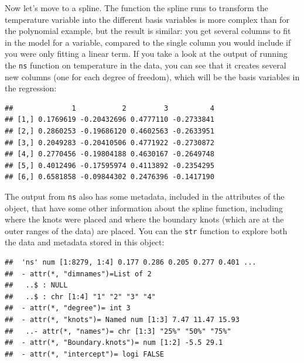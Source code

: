 \documentclass[
]{book}
\newenvironment{Shaded}{\begin{snugshade}}{\end{snugshade}}
\newcommand{\DataTypeTok}[1]{\textcolor[rgb]{0.13,0.29,0.53}{#1}}
\newcommand{\DecValTok}[1]{\textcolor[rgb]{0.00,0.00,0.81}{#1}}
\newcommand{\KeywordTok}[1]{\textcolor[rgb]{0.13,0.29,0.53}{\textbf{#1}}}
\newcommand{\NormalTok}[1]{#1}
\newcommand{\OperatorTok}[1]{\textcolor[rgb]{0.81,0.36,0.00}{\textbf{#1}}}
\newcommand{\StringTok}[1]{\textcolor[rgb]{0.31,0.60,0.02}{#1}}
\begin{document}
Now let's move to a spline. The function the spline runs to transform the temperature
variable into the different basis variables is more complex than for the polynomial example,
but the result is similar: you get several columns to fit in the model for a variable, compared
to the single column you would include if you were only fitting a linear term. If you
take a look at the output of running the \texttt{ns} function on temperature in the data, you can
see that it creates several new columns (one for each degree of freedom), which will be the
basis variables in the regression:

\begin{Shaded}
\end{Shaded}

\begin{verbatim}
##              1           2         3          4
## [1,] 0.1769619 -0.20432696 0.4777110 -0.2733841
## [2,] 0.2860253 -0.19686120 0.4602563 -0.2633951
## [3,] 0.2049283 -0.20410506 0.4771922 -0.2730872
## [4,] 0.2770456 -0.19804188 0.4630167 -0.2649748
## [5,] 0.4012496 -0.17595974 0.4113892 -0.2354295
## [6,] 0.6581858 -0.09844302 0.2476396 -0.1417190
\end{verbatim}

The output from \texttt{ns} also has some metadata, included in the attributes of the object, that
have some other information about the spline function, including where the knots were
placed and where the boundary knots (which are at the outer ranges of the data) are placed.
You can the \texttt{str} function to explore both the data and metadata stored in this object:

\begin{Shaded}
\end{Shaded}

\begin{verbatim}
##  'ns' num [1:8279, 1:4] 0.177 0.286 0.205 0.277 0.401 ...
##  - attr(*, "dimnames")=List of 2
##   ..$ : NULL
##   ..$ : chr [1:4] "1" "2" "3" "4"
##  - attr(*, "degree")= int 3
##  - attr(*, "knots")= Named num [1:3] 7.47 11.47 15.93
##   ..- attr(*, "names")= chr [1:3] "25%" "50%" "75%"
##  - attr(*, "Boundary.knots")= num [1:2] -5.5 29.1
##  - attr(*, "intercept")= logi FALSE
\end{verbatim}
\end{document}
